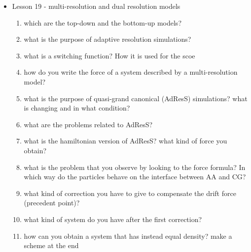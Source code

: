 {\begin{itemize}
\begin{enumerate}
        \item where do the knots tend to position themselves? why not on the stationary nodes? In which positions do they move? 
        \item how can you intend the position of a knot on a length? what type of ... you expect on the stationary points?
        \item what is interesting about knots in proteins? why you don't expect them?
        \item what characteristics are necessary for self-folding? what type of measures do you adopt as a consequence?
        \item what is an elastic folder model? what is its main role?
        \item what is the process through which you evlaluate the folding rate through the elastic folder model
        \item What type of measure do you adopt to evaluate the folding process?
        \item what is the RMSD?
    \end{enumerate}
    \item Lesson 19 - multi-resolution and dual resolution models
    \begin{enumerate}
        \item which are the top-down and the bottom-up models?
        \item what is the purpose of adaptive resolution simulations?
        \item what is a switching function? How it is used for the scoe
        \item how do you write the force of a system described by a multi-resolution model?
        \item what is the purpose of quasi-grand canonical (AdResS) simulations? what is changing and in what condition?
        \item what are the problems related to AdResS?
        \item what is the hamiltonian version of AdResS? what kind of force you obtain?
        \item what is the problem that you observe by looking to the force formula? In which way do the particles behave on the interface between AA and CG?
        \item what kind of correction you have to give to compensate the drift force (precedent point)?
        \item what kind of system do you have after the first correction?
        \item how can you obtain a system that has instead equal density? make a scheme at the end

\end{enumerate}
\end{itemize}}
